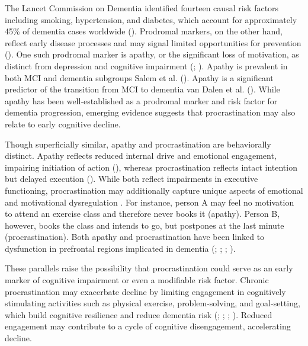 \documentclass[
]{article}
\begin{document}
The Lancet Commission on Dementia identified fourteen causal risk
factors including smoking, hypertension, and diabetes, which account for
approximately 45\% of dementia cases worldwide
(). Prodromal
markers, on the other hand, reflect early disease processes and may
signal limited opportunities for prevention
(). One such prodromal
marker is apathy, or the significant loss of motivation, as distinct
from depression and cognitive impairment
(;
). Apathy is prevalent
in both MCI and dementia subgroups Salem et al.
(). Apathy is a significant predictor of
the transition from MCI to dementia van Dalen et al.
(). While apathy has been
well-established as a prodromal marker and risk factor for dementia
progression, emerging evidence suggests that procrastination may also
relate to early cognitive decline.

Though superficially similar, apathy and procrastination are
behaviorally distinct. Apathy reflects reduced internal drive and
emotional engagement, impairing initiation of action
(), whereas
procrastination reflects intact intention but delayed execution
(). While both reflect impairments
in executive functioning, procrastination may additionally capture
unique aspects of emotional and motivational dysregulation . For
instance, person A may feel no motivation to attend an exercise class
and therefore never books it (apathy). Person B, however, books the
class and intends to go, but postpones at the last minute
(procrastination). Both apathy and procrastination have been linked to
dysfunction in prefrontal regions implicated in dementia
(;
;
;
).

These parallels raise the possibility that procrastination could serve
as an early marker of cognitive impairment or even a modifiable risk
factor. Chronic procrastination may exacerbate decline by limiting
engagement in cognitively stimulating activities such as physical
exercise, problem-solving, and goal-setting, which build cognitive
resilience and reduce dementia risk
(;
;
;
).
Reduced engagement may contribute to a cycle of cognitive disengagement,
accelerating decline.
\end{document}
